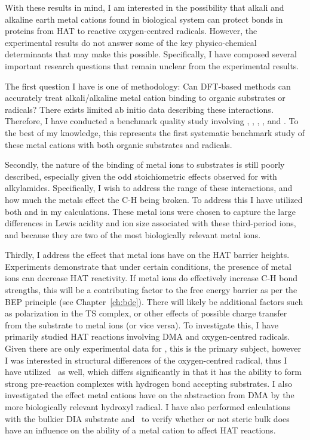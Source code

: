 With these results in mind, I am interested in the possibility that alkali and
alkaline earth metal cations found in biological system can protect 
bonds in proteins from HAT to reactive oxygen-centred radicals. However, the
experimental results do not answer some of the key physico-chemical determinants
that may make this possible. Specifically, I have composed several important
research questions that remain unclear from the experimental results.

The first question I have is one of methodology: Can DFT-based methods can
accurately treat alkali/alkaline metal cation binding to organic substrates or
radicals? There exists limited ab initio data describing these
interactions.\cite{ Siu2001, Corral2003, Suarez2011, Baldauf2013} Therefore, I
have conducted a benchmark quality study involving , ,
, , and . To the best of my knowledge, this
represents the first systematic benchmark study of these metal cations with both
organic substrates and radicals.

Secondly, the nature of the binding of metal ions to substrates is still poorly
described, especially given the odd stoichiometric effects observed for
 with alkylamides. Specifically, I wish to address the range of
these interactions, and how much the metals effect the C-H being broken. To
address this I have utilized both  and  in my calculations.
These metal ions were chosen to capture the large differences in Lewis acidity
and ion size associated with these third-period ions, and because they are two
of the most biologically relevant metal ions.

Thirdly, I address the effect that metal ions have on the HAT barrier heights.
Experiments demonstrate that under certain conditions, the presence of metal
ions can decrease HAT reactivity. If metal ions do effectively increase C-H bond
strengths, this will be a contributing factor to the free energy barrier as per
the BEP principle\cite{Bell1936,Evans1938} (see Chapter~\ref{ch:bde}). There
will likely be additional factors such as polarization in the TS complex, or
other effects of possible charge transfer from the substrate to metal ions (or
vice versa). To investigate this, I have primarily studied HAT reactions
involving DMA and oxygen-centred radicals. Given there are only experimental
data for \cumo, this is the primary subject, however I was interested in
structural differences of the oxygen-centred radical, thus I have utilized \bno\
as well, which differs significantly in that it has the ability to form strong
pre-reaction complexes with hydrogen bond accepting
substrates.\cite{Salamone2012, Salamone2013} I also investigated the effect
metal cations have on the abstraction from DMA by the more biologically relevant
hydroxyl radical. I have also performed calculations with the bulkier DIA
substrate and \cumo\ to verify whether or not steric bulk does have an influence
on the ability of a metal cation to affect HAT reactions.

